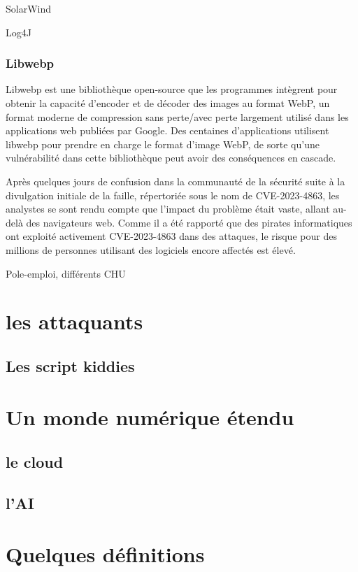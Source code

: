 SolarWind

Log4J

\subsubsection{Libwebp}
Libwebp est une bibliothèque open-source que les programmes intègrent pour obtenir la capacité d'encoder et de décoder des images au format WebP, un format moderne de compression sans perte/avec perte largement utilisé dans les applications web publiées par Google. Des centaines d'applications utilisent libwebp pour prendre en charge le format d'image WebP, de sorte qu'une vulnérabilité dans cette bibliothèque peut avoir des conséquences en cascade.

Après quelques jours de confusion dans la communauté de la sécurité suite à la divulgation initiale de la faille, répertoriée sous le nom de CVE-2023-4863, les analystes se sont rendu compte que l'impact du problème était vaste, allant au-delà des navigateurs web. Comme il a été rapporté que des pirates informatiques ont exploité activement CVE-2023-4863 dans des attaques, le risque pour des millions de personnes utilisant des logiciels encore affectés est élevé.


Pole-emploi, différents CHU


\section{les attaquants}

\subsection{Les script kiddies}

\section{Un monde numérique étendu}


\subsection{le cloud}

\subsection{l'AI}


\section{Quelques définitions}